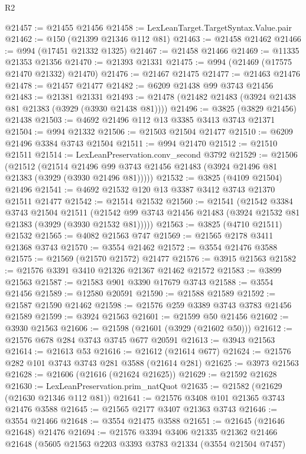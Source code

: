 \begin{lexlean}{R2}
\begin{coremodule}
@21457 := @21455 @21456
@21458 := LexLeanTarget.TargetSyntax.Value.pair
@21462 := @150 (@21399 @21346 @112 @81)
@21463 := @21458 @21462
@21466 := @994 (@17451 @21332 @1325)
@21467 := @21458 @21466
@21469 := @11335 @21353 @21356
@21470 := @21393 @21331
@21475 := @994 (@21469 (@17575 @21470 @21332) @21470)
@21476 := @21467 @21475
@21477 := @21463 @21476
@21478 := @21457 @21477
@21482 := @6209 @21438 @99 @3743 @21456
@21483 := @21381 @21331
@21493 := @21478 (@21482 @21483 (@3924 @21438 @81 @21383 (@3929 (@3930 @21438 @81))))
@21496 := @3825 (@3829 @21456) @21438
@21503 := @4692 @21496 @112 @13 @3385 @3413 @3743 @21371
@21504 := @994 @21332
@21506 := @21503 @21504 @21477
@21510 := @6209 @21496 @3384 @3743 @21504
@21511 := @994 @21470
@21512 := @21510 @21511
@21514 := LexLeanPreservation.conv_second @3792
@21529 := @21506
    (@21512
      (@21514 @21496 @99 @3743 @21456 @21483 (@3924 @21496 @81 @21383 (@3929 (@3930 @21496 @81)))))
@21532 := @3825 (@4109 @21504) @21496
@21541 := @4692 @21532 @120 @13 @3387 @3412 @3743 @21370 @21511 @21477
@21542 := @21514 @21532
@21560 := @21541
    (@21542
      @3384
      @3743
      @21504
      @21511
      (@21542 @99 @3743 @21456 @21483 (@3924 @21532 @81 @21383 (@3929 (@3930 @21532 @81)))))
@21563 := @3825 (@4710 @21511) @21532
@21565 := @4082 @21563 @747
@21569 := @21565 @2178 @3411 @21368 @3743
@21570 := @3554 @21462
@21572 := @3554 @21476 @3588
@21575 := @21569 (@21570 @21572) @21477
@21576 := @3915 @21563
@21582 := @21576 @3391 @3410 @21326 @21367 @21462 @21572
@21583 := @3899 @21563
@21587 := @21583 @901 @3390 @17679 @3743
@21588 := @3554 @21456
@21589 := @12580 @20591
@21590 := @21588 @21589
@21592 := @21587 @21590 @21462
@21598 := @21576 @259 @3389 @3743 @3783 @21456 @21589
@21599 := @3924 @21563
@21601 := @21599 @50 @21456
@21602 := @3930 @21563
@21606 := @21598 (@21601 (@3929 (@21602 @50)))
@21612 := @21576 @678 @284 @3743 @3745 @677 @20591
@21613 := @3943 @21563
@21614 := @21613 @53
@21616 := @21612 (@21614 @677)
@21624 := @21576 @282 @101 @3743 @3743 @281 @3588 (@21614 @281)
@21625 := @3973 @21563
@21628 := @21606 (@21616 (@21624 @21625))
@21629 := @21592 @21628
@21630 := LexLeanPreservation.prim_natQuot
@21635 := @21582 (@21629 (@21630 @21346 @112 @81))
@21641 := @21576 @3408 @101 @21365 @3743 @21476 @3588
@21645 := @21565 @2177 @3407 @21363 @3743
@21646 := @3554 @21466
@21648 := @3554 @21475 @3588
@21651 := @21645 (@21646 @21648) @21476
@21694 := @21576
    @3394
    @3406
    @21335
    @21362
    @21466
    @21648
    (@5605
      @21563
      @2203
      @3393
      @3783
      @21334
      (@3554 @21504 @7457)

\end{coremodule}
\end{lexlean}
